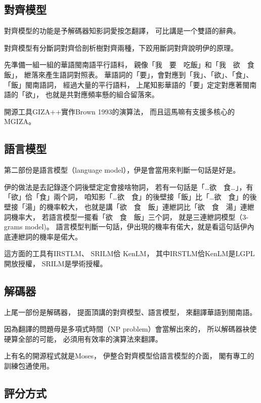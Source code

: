 \subsection{對齊模型}
\label{小節：對齊模型}
對齊模型的功能是予解碼器知影詞愛按怎翻譯，
可比講是一个雙語的辭典。

對齊模型有分斷詞對齊佮剖析樹對齊兩種，下跤用斷詞對齊說明伊的原理。

先準備一組一組的華語閩南語平行語料，
親像「我　要　吃飯」和「我　欲　食　飯」，
紲落來產生語詞對照表。
華語詞的「要」，會對應到「我」、「欲」、「食」、「飯」閩南語詞，
經過大量的平行語料，
上尾知影華語的「要」定定對應著閩南語的「欲」，
也就是共對應頻率懸的組合留落來。

開源工具GIZA++\cite{och2003systematic}實作Brown 1993的演算法，
而且這馬嘛有支援多核心的MGIZA\cite{gao2008parallel}。

\subsection{語言模型}
\label{小節：語言模型}
第二部份是語言模型（language model），伊是會當用來判斷一句話是好是。

伊的做法是去記錄逐个詞後壁定定會接啥物詞，
若有一句話是「…欲　食…」，有「欲」佮「食」兩个詞，
咱知影「…欲　食」的後壁接「飯」比「…欲　食」的後壁接「湯」的機率較大，
也就是講「欲　食　飯」連紲詞比「欲　食　湯」連紲詞機率大，
若語言模型一擺看「欲　食　飯」三个詞，
就是三連紲詞模型（3-grams model)。
語言模型判斷一句話，伊出現的機率有偌大，就是看這句話伊內底連紲詞的機率是偌大。

這方面的工具有IRSTLM\cite{federico2008irstlm}、
SRILM\cite{stolcke2002srilm}佮
KenLM\cite{Heafield-estimate}，
其中IRSTLM佮KenLM是LGPL開放授權，
SRILM是學術授權。

\subsection{解碼器}
\label{小節：解碼器}
上尾一部份是解碼器，
提面頂講的對齊模型、語言模型，
來翻譯華語到閩南語。

因為翻譯的問題毋是多項式時間（NP problem）會當解出來的，
所以解碼器袂使硬算全部的可能，
必須用有效率的演算法來翻譯。

上有名的開源程式就是Moses\cite{Koehn:2007:MOS:1557769.1557821}，
伊整合對齊模型佮語言模型的介面，
閣有專工的訓練包通使用\cite{Moses訓練包}。

\subsection{評分方式}
\label{小節：翻譯評分方式}

